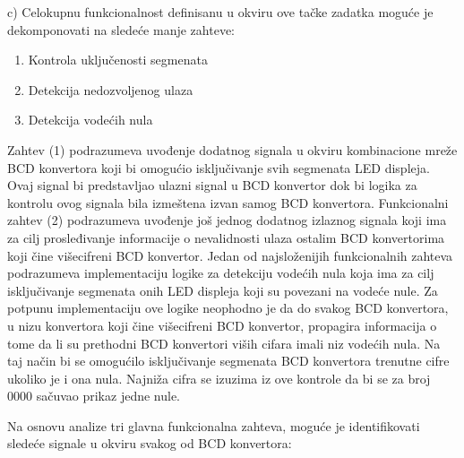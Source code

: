 \documentclass[a4paper,11pt]{article}
\numberwithin{equation}{section} %
\begin{document}
\noindent\begin{minipage}{\linewidth}
c) Celokupnu funkcionalnost definisanu u okviru ove tačke zadatka moguće je
dekomponovati na sledeće manje zahteve:
\begin{enumerate}
\item Kontrola uključenosti segmenata
\item Detekcija nedozvoljenog ulaza
\item Detekcija vodećih nula
\end{enumerate}
\end{minipage}
\vspace{1em}

Zahtev (1) podrazumeva uvođenje dodatnog signala u okviru kombinacione mreže
BCD konvertora koji bi omogućio isključivanje svih segmenata LED displeja. Ovaj signal bi
predstavljao ulazni signal u BCD konvertor dok bi logika za kontrolu ovog signala bila
izmeštena izvan samog BCD konvertora. Funkcionalni zahtev (2) podrazumeva uvođenje još
jednog dodatnog izlaznog signala koji ima za cilj prosleđivanje informacije o nevalidnosti
ulaza ostalim BCD konvertorima koji čine višecifreni BCD konvertor. Jedan od
najsloženijih funkcionalnih zahteva podrazumeva implementaciju logike za detekciju
vodećih nula koja ima za cilj isključivanje segmenata onih LED displeja koji su povezani na
vodeće nule. Za potpunu implementaciju ove logike neophodno je da do svakog BCD
konvertora, u nizu konvertora koji čine višecifreni BCD konvertor, propagira informacija o
tome da li su prethodni BCD konvertori viših cifara imali niz vodećih nula. Na taj način bi se
omogućilo isključivanje segmenata BCD konvertora trenutne cifre ukoliko je i ona nula. Najniža cifra se izuzima iz ove kontrole da bi se za broj 0000 sačuvao prikaz jedne nule.

Na osnovu analize tri glavna funkcionalna zahteva, moguće je identifikovati sledeće
signale u okviru svakog od BCD konvertora:
\end{document}

